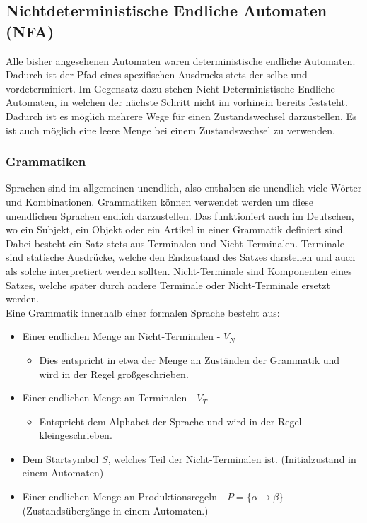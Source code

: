 \documentclass{article}
\begin{document}
	\subsection{Nichtdeterministische Endliche Automaten (NFA)}
	Alle bisher angesehenen Automaten waren deterministische endliche Automaten. Dadurch ist der Pfad eines spezifischen Ausdrucks stets der selbe und vordeterminiert. Im Gegensatz dazu stehen Nicht-Deterministische Endliche Automaten, in welchen der nächste Schritt nicht im vorhinein bereits feststeht. Dadurch ist es möglich mehrere Wege für einen Zustandswechsel darzustellen. Es ist auch möglich eine leere Menge bei einem Zustandswechsel zu verwenden.
	\subsubsection{Grammatiken}
	Sprachen sind im allgemeinen unendlich, also enthalten sie unendlich viele Wörter und Kombinationen. Grammatiken können verwendet werden um diese unendlichen Sprachen endlich darzustellen. Das funktioniert auch im Deutschen, wo ein Subjekt, ein Objekt oder ein Artikel in einer Grammatik definiert sind. \\
	Dabei besteht ein Satz stets aus Terminalen und Nicht-Terminalen. Terminale sind statische Ausdrücke, welche den Endzustand des Satzes darstellen und auch als solche interpretiert werden sollten. Nicht-Terminale sind Komponenten eines Satzes, welche später durch andere Terminale oder Nicht-Terminale ersetzt werden. \\
	Eine Grammatik innerhalb einer formalen Sprache besteht aus:
	\begin{itemize}
		\item{Einer endlichen Menge an Nicht-Terminalen - $V_N$}
		\begin{itemize}
			\item{Dies entspricht in etwa der Menge an Zuständen der Grammatik und wird in der Regel großgeschrieben.}
		\end{itemize}
		\item{Einer endlichen Menge an Terminalen - $V_T$}
		\begin{itemize}
			\item{Entspricht dem Alphabet der Sprache und wird in der Regel kleingeschrieben.}
		\end{itemize}
		\item{Dem Startsymbol $S$, welches Teil der Nicht-Terminalen ist. (Initialzustand in einem Automaten)}
		\item{Einer endlichen Menge an Produktionsregeln - $P =\{\alpha \rightarrow \beta\}$ (Zustandsübergänge in einem Automaten.)}
	\end{itemize}
\end{document}
